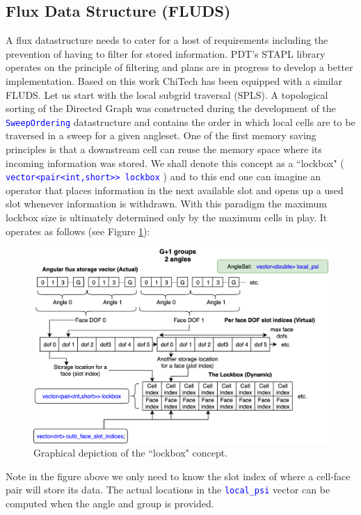 \documentclass[11pt,letterpaper,titlepage]{article}
\newcommand{\xmltag}[1]{\textcolor{blue}{ \texttt{#1}} }
\numberwithin{equation}{section}
\begin{document}
\newpage 
\subsection{Flux Data Structure (FLUDS)}
A flux datastructure needs to cater for a host of requirements including the prevention of having to filter for stored information. PDT's STAPL library operates on the principle of filtering and plans are in progress \cite{AdamsSPDS} to develop a better implementation. Based on this work ChiTech has been equipped with a similar FLUDS.
\newline
\newline
Let us start with the local subgrid traversal (SPLS). A topological sorting of the Directed Graph was constructed during the development of the \xmltag{SweepOrdering} datastructure and contains the order in which local cells are to be traversed in a sweep for a given angleset. One of the first memory saving principles is that a downstream cell can reuse the memory space where its incoming information was stored. We shall denote this concept as a ``lockbox" (\xmltag{vector<pair<int,short>> lockbox}) and to this end one can imagine an operator that places information in the next available slot and opens up a used slot whenever information is withdrawn. With this paradigm the maximum lockbox size is ultimately determined only by the maximum cells in play. It operates as follows (see Figure \ref{fig:lockbox}):

\begin{figure}[H]
\centering
\includegraphics[width=0.9\linewidth]{LatexDraw/Lockbox}
\caption{Graphical depiction of the ``lockbox" concept.}
\label{fig:lockbox}
\end{figure}

Note in the figure above we only need to know the slot index of where a cell-face pair will store its data. The actual locations in the \xmltag{local\_psi} vector can be computed when the angle and group is provided.
\newline
\end{document}
